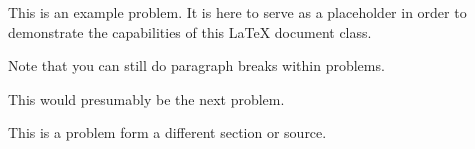 \documentclass{homework}
\begin{document}
\maketitle


\begin{problem}{1.2}
This is an example problem. It is here to serve as a
placeholder in order to demonstrate the capabilities of this \LaTeX{}
document class.

Note that you can still do paragraph breaks within problems.
\end{problem}

\begin{problem}{1.3}
This would presumably be the next problem.
\end{problem}


\begin{problem}{10}
This is a problem form a different section or source.
\end{problem}
\end{document}
